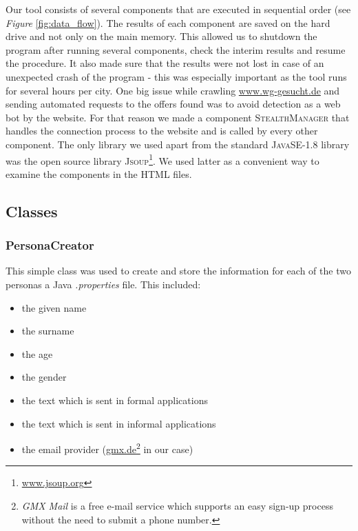 \documentclass[11pt]{scrartcl}
\begin{document}
Our tool consists of several components that are executed in sequential order (see \textit{Figure} \ref{fig:data_flow}). The results of each component are saved on the hard drive and not only on the main memory. This allowed us to shutdown the program after running several components, check the interim results and resume the procedure. It also made sure that the results were not lost in case of an unexpected crash of the program - this was especially important as the tool runs for several hours per city. \newline
One big issue while crawling \url{www.wg-gesucht.de} and sending automated requests to the offers found was to avoid detection as a web bot by the website. For that reason we made a component \textsc{StealthManager} that handles the connection process to the website and is called by every other component.
The only library we used apart from the standard \textsc{JavaSE-1.8} library was the open source library \textsc{Jsoup}\footnote{\url{www.jsoup.org}}. We used latter as a convenient way to examine the components in the HTML files.

\subsection{Classes}

\subsubsection{PersonaCreator}

This simple class was used to create and store the information for each of the two personas a Java \textit{.properties} file. This included:
\begin{itemize}
    \item the given name
    \item the surname
    \item the age
    \item the gender
    \item the text which is sent in formal applications
    \item the text which is sent in informal applications
    \item the email provider (\url{gmx.de}\footnote{\textit{GMX Mail} is a free e-mail service which supports an easy sign-up process without the need to submit a phone number.} in our case)
\end{itemize}
\newpage
\end{document}

